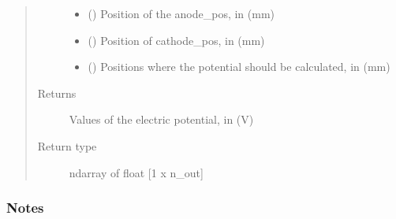 \documentclass[letterpaper,10pt,english,openany,oneside]{sphinxmanual}
\begin{document}
\begin{fulllineitems}
\begin{quote}
\begin{description}
\begin{itemize}
\item {} 
\sphinxstyleliteralstrong{\sphinxupquote{{[}}}\sphinxstyleliteralstrong{\sphinxupquote{{]}}} (\sphinxstyleliteralemphasis{\sphinxupquote{ {[}}}\sphinxstyleliteralemphasis{\sphinxupquote{{]}}}) \textendash{} Position of the anode\_pos, in (mm)

\item {} 
\sphinxstyleliteralstrong{\sphinxupquote{{[}}}\sphinxstyleliteralstrong{\sphinxupquote{{]}}} (\sphinxstyleliteralemphasis{\sphinxupquote{ {[}}}\sphinxstyleliteralemphasis{\sphinxupquote{{]}}}) \textendash{} Position of cathode\_pos, in (mm)

\item {} 
\sphinxstyleliteralstrong{\sphinxupquote{{[}}}\sphinxstyleliteralstrong{\sphinxupquote{{]}}} (\sphinxstyleliteralemphasis{\sphinxupquote{ {[}}}\sphinxstyleliteralemphasis{\sphinxupquote{{]}}}) \textendash{} Positions where the potential should be calculated, in (mm)

\end{itemize}

\item[{Returns}] \leavevmode
{} \textendash{} Values of the electric potential, in (V)

\item[{Return type}] \leavevmode
ndarray of float {[}1 x n\_out{]}

\end{description}\end{quote}
\subsubsection*{Notes}


\end{fulllineitems}
\end{document}

